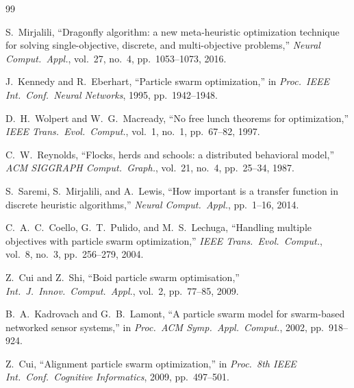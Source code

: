 \documentclass[11pt,a4paper]{article}
\begin{document}

\begin{thebibliography}{99}

S.~Mirjalili, ``Dragonfly algorithm: a new meta-heuristic optimization technique for solving single-objective, discrete, and multi-objective problems,''
\textit{Neural Comput.\ Appl.}, vol.~27, no.~4, pp.~1053--1073, 2016.

J.~Kennedy and R.~Eberhart, ``Particle swarm optimization,'' in
\textit{Proc.\ IEEE Int.\ Conf.\ Neural Networks}, 1995, pp.~1942--1948.

D.~H.~Wolpert and W.~G.~Macready, ``No free lunch theorems for optimization,''
\textit{IEEE Trans.\ Evol.\ Comput.}, vol.~1, no.~1, pp.~67--82, 1997.

C.~W.~Reynolds, ``Flocks, herds and schools: a distributed behavioral model,''
\textit{ACM SIGGRAPH Comput.\ Graph.}, vol.~21, no.~4, pp.~25--34, 1987.

S.~Saremi, S.~Mirjalili, and A.~Lewis, ``How important is a transfer function in discrete heuristic algorithms,''
\textit{Neural Comput.\ Appl.}, pp.~1--16, 2014.

C.~A.~C.~Coello, G.~T.~Pulido, and M.~S.~Lechuga, ``Handling multiple objectives with particle swarm optimization,''
\textit{IEEE Trans.\ Evol.\ Comput.}, vol.~8, no.~3, pp.~256--279, 2004.

Z.~Cui and Z.~Shi, ``Boid particle swarm optimisation,''
\textit{Int.\ J.\ Innov.\ Comput.\ Appl.}, vol.~2, pp.~77--85, 2009.

B.~A.~Kadrovach and G.~B.~Lamont, ``A particle swarm model for swarm-based networked sensor systems,'' in
\textit{Proc.\ ACM Symp.\ Appl.\ Comput.}, 2002, pp.~918--924.

Z.~Cui, ``Alignment particle swarm optimization,'' in
\textit{Proc.\ 8th IEEE Int.\ Conf.\ Cognitive Informatics}, 2009, pp.~497--501.

\end{thebibliography}
\end{document}
